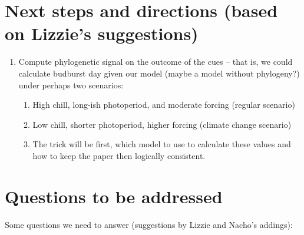 \documentclass{article}\usepackage[]{graphicx}\usepackage[]{color}
\begin{document}
\section*{Next steps and directions (based on Lizzie's suggestions)}
\begin{enumerate}
\item Compute phylogenetic signal on the outcome of the cues -- that is, we could calculate budburst day given our model (maybe a model without phylogeny?) under perhaps two scenarios:
     
\begin{enumerate}
\item High chill, long-ish photoperiod, and moderate forcing (regular scenario)

\item Low chill, shorter photoperiod, higher forcing (climate change scenario)

\item The trick will be first, which model to use to calculate these values and how to keep the paper then logically consistent.
\end{enumerate}
  
\end{enumerate}

\section*{Questions to be addressed}

Some questions we need to answer (suggestions by Lizzie and Nacho's addings):
\end{document}
